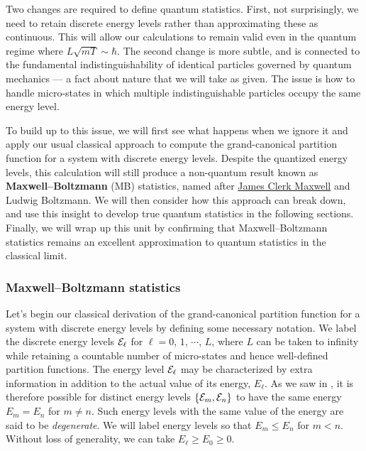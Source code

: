 Two changes are required to define quantum statistics.
First, not surprisingly, we need to retain discrete energy levels rather than approximating these as continuous.
This will allow our calculations to remain valid even in the quantum regime where $L\sqrt{mT} \sim \hbar$.
The second change is more subtle, and is connected to the fundamental indistinguishability of identical particles governed by quantum mechanics --- a fact about nature that we will take as given.
The issue is how to handle micro-states in which multiple indistinguishable particles occupy the same energy level.

To build up to this issue, we will first see what happens when we ignore it and apply our usual classical approach to compute the grand-canonical partition function for a system with discrete energy levels.
Despite the quantized energy levels, this calculation will still produce a non-quantum result known as \textbf{Maxwell--Boltzmann} (MB) statistics, named after \href{https://en.wikipedia.org/wiki/James_Clerk_Maxwell}{James Clerk Maxwell} and Ludwig Boltzmann.
We will then consider how this approach can break down, and use this insight to develop true quantum statistics in the following sections.
Finally, we will wrap up this unit by confirming that Maxwell--Boltzmann statistics remains an excellent approximation to quantum statistics in the classical limit.



\subsubsection{Maxwell--Boltzmann statistics}
Let's begin our classical derivation of the grand-canonical partition function for a system with discrete energy levels by defining some necessary notation.
We label the discrete energy levels $\mathcal E_{\ell}$ for $\ell = 0$, $1$, $\cdots$, $L$, where $L$ can be taken to infinity while retaining a countable number of micro-states and hence well-defined partition functions.
The energy level $\mathcal E_{\ell}$ may be characterized by extra information in addition to the actual value of its energy, $E_{\ell}$.
As we saw in , it is therefore possible for distinct energy levels $\left\{\mathcal E_m, \mathcal E_n\right\}$ to have the same energy $E_m = E_n$ for $m \neq n$. %
Such energy levels with the same value of the energy are said to be \textit{degenerate}.
We will label energy levels so that $E_m \leq E_n$ for $m < n$.
Without loss of generality, we can take $E_{\ell} \geq E_0 \geq 0$.

